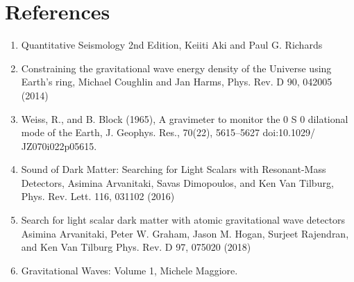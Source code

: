 \documentclass{article}
\begin{document}
\section{References}
 \begin{enumerate}
\item Quantitative Seismology 2nd Edition, Keiiti Aki and Paul G. Richards

\item Constraining the gravitational wave energy density of the Universe using Earth’s ring, Michael Coughlin and Jan Harms, Phys. Rev. D 90, 042005 (2014) 

\item Weiss, R., and B. Block (1965), A gravimeter to monitor the 0 S 0 dilational mode of the Earth, J. Geophys. Res., 70(22), 5615–5627 doi:10.1029/ JZ070i022p05615.

\item Sound of Dark Matter: Searching for Light Scalars with Resonant-Mass Detectors, Asimina Arvanitaki, Savas Dimopoulos, and Ken Van Tilburg, Phys. Rev. Lett. 116, 031102 (2016)

\item Search for light scalar dark matter with atomic gravitational wave detectors
Asimina Arvanitaki, Peter W. Graham, Jason M. Hogan, Surjeet Rajendran, and Ken Van Tilburg
Phys. Rev. D 97, 075020 (2018)

\item Gravitational Waves: Volume 1, Michele Maggiore.
\end{enumerate}
\end{document}
